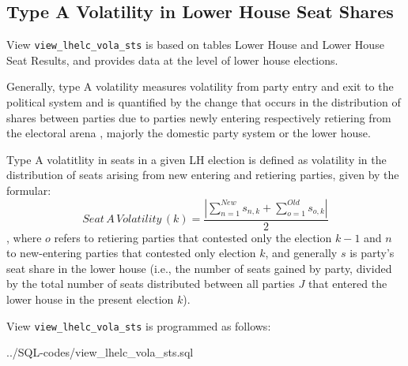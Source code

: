 \subsection{Type A Volatility in Lower House Seat Shares}\label{view_lhelc_vola_sts}
View \texttt{\footnotesize view\_lhelc\_vola\_sts} is based on tables Lower House and Lower House Seat Results, and provides data at the level of lower house elections.

Generally, type A volatility measures volatility from party entry and exit to the political system and is quantified by the change that occurs in the distribution of shares between parties due to parties newly entering respectively retiering from the electoral arena \citep{Powell&Tucker2013}, majorly the domestic party system or the lower house. 

Type A volatitlity in seats in a given LH election is defined as volatility in the distribution of seats arising from new entering and retiering parties, given by the formular: 
\begin{equation}\label{equ_seat_a_volatility}
Seat\,A\,Volatility\,(k) = \frac{ | \sum\limits_{n=1}^{New} s_{n,k} + \sum\limits_{o=1}^{Old} s_{o,k} | }{2}
\end{equation}
, where $o$ refers to retiering parties that contested only the election $k-1$ and $n$ to new-entering
parties that contested only election $k$, and generally $s$ is party's seat share in the lower house (i.e., the number of seats gained by party, divided by the total number of seats distributed between all parties $J$ that entered the lower house in the present election $k$).




View \texttt{\footnotesize view\_lhelc\_vola\_sts} is programmed as follows:

%
{../SQL-codes/view_lhelc_vola_sts.sql}

